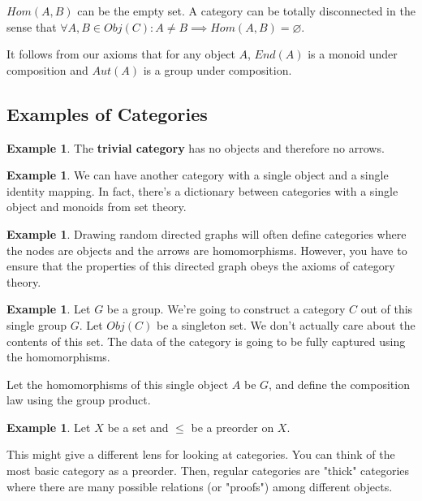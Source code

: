 \documentclass{article}
\theoremstyle{definition}
\newtheorem{example}[theorem]{Example}
\begin{document}
$Hom(A,B)$ can be the empty set. A category can be totally disconnected in the sense
that $\forall A,B \in Obj(C): A \neq B \implies Hom(A,B) = \varnothing$.

It follows from our axioms that for any object $A$, $End(A)$ is a monoid under composition
and $Aut(A)$ is a group under composition.

\newpage

\subsection{Examples of Categories}

\begin{example}
    The \textbf{trivial category} has no objects and therefore no arrows.
\end{example}

\begin{example}
    We can have another category with a single object and a single identity mapping.
    In fact, there's a dictionary between categories with a single object and monoids
    from set theory.
\end{example}

\begin{example}
    Drawing random directed graphs will often define categories where the
    nodes are objects and the arrows are homomorphisms. However, you have to
    ensure that the properties of this directed graph obeys the axioms of 
    category theory.
\end{example}

\begin{example}
    Let $G$ be a group. We're going to construct a category $C$ out of this single
    group $G$. Let $Obj(C)$ be a singleton set. We don't actually care about the
    contents of this set. The data of the category is going to be fully captured
    using the homomorphisms.

    Let the homomorphisms of this single object $A$ be $G$, and define the
    composition law using the group product. 
\end{example}

\begin{example}
    Let $X$ be a set and $\leq$ be a preorder on $X$.
\end{example}

This might give a different lens for looking at categories. You can think of the most basic
category as a preorder. Then, regular categories are "thick" categories where there are many
possible relations (or "proofs") among different objects.
\end{document}
